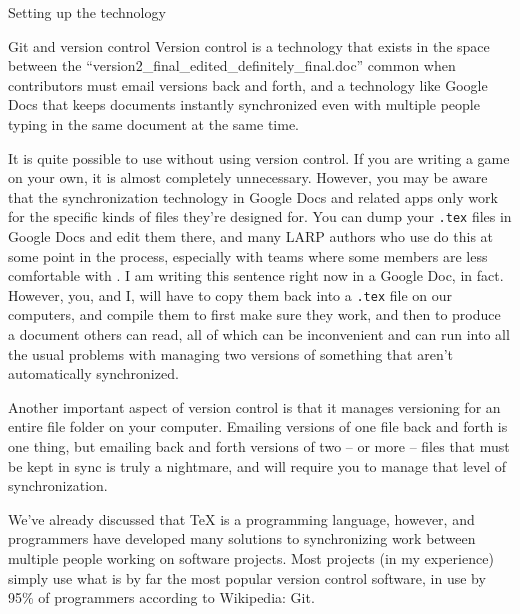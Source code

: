 \documentclass[sheet]{GameTexBase}
\begin{document}
\begin{section}{Setting up the technology}
\begin{subsection}{Git and version control}
Version control is a technology that exists in the space between the ``version2\_final\_edited\_definitely\_final.doc'' common when contributors must email versions back and forth, and a technology like Google Docs that keeps documents instantly synchronized even with multiple people typing in the same document at the same time.

It is quite possible to use \gametex{} without using version control.  If you are writing a game on your own, it is almost completely unnecessary.  However, you may be aware that the synchronization technology in Google Docs and related apps only work for the specific kinds of files they're designed for.  You can dump your \lstinline|.tex| files in Google Docs and edit them there, and many LARP authors who use \gametex{} do this at some point in the process, especially with teams where some members are less comfortable with \gametex{}.  I am writing this sentence right now in a Google Doc, in fact.  However, you, and I, will have to copy them back into a \texttt{.tex} file on our computers, and compile them to first make sure they work, and then to produce a document others can read, all of which can be inconvenient and can run into all the usual problems with managing two versions of something that aren't automatically synchronized.

Another important aspect of version control is that it manages versioning for an entire file folder on your computer.  Emailing versions of one file back and forth is one thing, but emailing back and forth versions of two -- or more -- files that must be kept in sync is truly a nightmare, and \gametex{} will require you to manage that level of synchronization.

We've already discussed that \TeX{} is a programming language, however, and programmers have developed many solutions to synchronizing work between multiple people working on software projects.  Most \gametex{} projects (in my experience) simply use what is by far the most popular version control software, in use by 95\% of programmers according to Wikipedia: Git.


\end{subsection}
\end{section}
\end{document}
